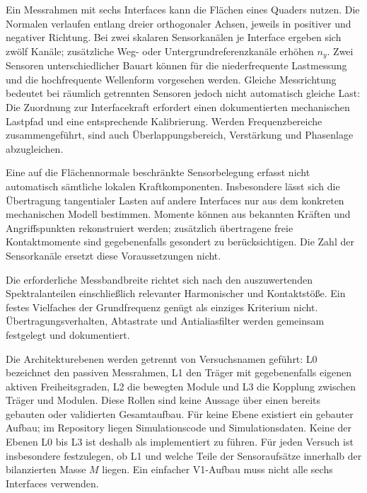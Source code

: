 \documentclass[11pt,a4paper]{article}
\begin{document}
Ein Messrahmen mit sechs Interfaces kann die Flächen eines Quaders nutzen. Die Normalen verlaufen entlang dreier orthogonaler Achsen, jeweils in positiver und negativer Richtung. Bei zwei skalaren Sensorkanälen je Interface ergeben sich zwölf Kanäle; zusätzliche Weg- oder Untergrundreferenzkanäle erhöhen $n_y$. Zwei Sensoren unterschiedlicher Bauart können für die niederfrequente Lastmessung und die hochfrequente Wellenform vorgesehen werden. Gleiche Messrichtung bedeutet bei räumlich getrennten Sensoren jedoch nicht automatisch gleiche Last: Die Zuordnung zur Interfacekraft erfordert einen dokumentierten mechanischen Lastpfad und eine entsprechende Kalibrierung. Werden Frequenzbereiche zusammengeführt, sind auch Überlappungsbereich, Verstärkung und Phasenlage abzugleichen.

Eine auf die Flächennormale beschränkte Sensorbelegung erfasst nicht automatisch sämtliche lokalen Kraftkomponenten. Insbesondere lässt sich die Übertragung tangentialer Lasten auf andere Interfaces nur aus dem konkreten mechanischen Modell bestimmen. Momente können aus bekannten Kräften und Angriffspunkten rekonstruiert werden; zusätzlich übertragene freie Kontaktmomente sind gegebenenfalls gesondert zu berücksichtigen. Die Zahl der Sensorkanäle ersetzt diese Voraussetzungen nicht.

Die erforderliche Messbandbreite richtet sich nach den auszuwertenden Spektralanteilen einschließlich relevanter Harmonischer und Kontaktstöße. Ein festes Vielfaches der Grundfrequenz genügt als einziges Kriterium nicht. Übertragungsverhalten, Abtastrate und Antialiasfilter werden gemeinsam festgelegt und dokumentiert.

Die Architekturebenen werden getrennt von Versuchsnamen geführt: L0 bezeichnet den passiven Messrahmen, L1 den Träger mit gegebenenfalls eigenen aktiven Freiheitsgraden, L2 die bewegten Module und L3 die Kopplung zwischen Träger und Modulen. Diese Rollen sind keine Aussage über einen bereits gebauten oder validierten Gesamtaufbau. Für keine Ebene existiert ein gebauter Aufbau; im Repository liegen Simulationscode und Simulationsdaten. Keine der Ebenen L0 bis L3 ist deshalb als implementiert zu führen. Für jeden Versuch ist insbesondere festzulegen, ob L1 und welche Teile der Sensoraufsätze innerhalb der bilanzierten Masse $M$ liegen. Ein einfacher V1-Aufbau muss nicht alle sechs Interfaces verwenden.
\end{document}
